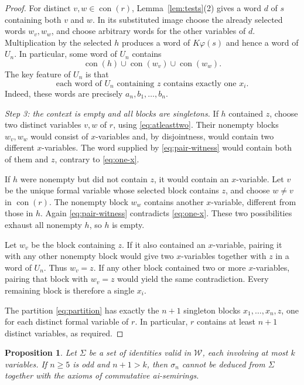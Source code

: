 \documentclass[11pt,reqno]{amsart}
\numberwithin{equation}{section}
\newtheorem{proposition}[theorem]{Proposition}
\theoremstyle{definition}
\theoremstyle{remark}
\DeclareMathOperator{\con}{con}
\newcommand{\W}{\mathcal W}
\begin{document}
\begin{proof}
For distinct $v,w\in\con(r)$,
Lemma~\ref{lem:tests}(2) gives a word $d$ of $s$ containing
both $v$ and $w$. In its substituted image choose the already
selected words $w_v,w_w$, and choose arbitrary words for the
other variables of $d$. Multiplication by the selected $h$
produces a word of $K\varphi(s)$ and hence a word of $U_n$.
In particular, some word of $U_n$ contains
\begin{equation}\label{eq:pair-witness}
\con(h)\cup\con(w_v)\cup\con(w_w).
\end{equation}
The key feature of $U_n$ is that
\begin{equation}\label{eq:one-x}
\text{each word of $U_n$ containing $z$ contains exactly one $x_i$.}
\end{equation}
Indeed, these words are precisely $a_n,b_1,\ldots,b_n$.

\emph{Step 3: the context is empty and all blocks are singletons.}
If $h$ contained $z$, choose two distinct variables $v,w$
of $r$, using \eqref{eq:atleasttwo}. Their nonempty blocks
$w_v,w_w$ would consist of $x$-variables and, by disjointness,
would contain two different $x$-variables. The word supplied
by \eqref{eq:pair-witness} would contain both of them and
$z$, contrary to \eqref{eq:one-x}.

If $h$ were nonempty but did not contain $z$, it would
contain an $x$-variable. Let $v$ be the unique formal
variable whose selected block contains $z$, and choose
$w\neq v$ in $\con(r)$. The nonempty block $w_w$ contains
another $x$-variable, different from those in $h$. Again
\eqref{eq:pair-witness} contradicts \eqref{eq:one-x}.
These two possibilities exhaust all nonempty $h$, so $h$
is empty.

Let $w_v$ be the block containing $z$. If it also contained
an $x$-variable, pairing it with any other nonempty block
would give two $x$-variables together with $z$ in a word
of $U_n$. Thus $w_v=z$. If any other block contained two
or more $x$-variables, pairing that block with $w_v=z$
would yield the same contradiction. Every remaining block
is therefore a single $x_i$.

The partition \eqref{eq:partition} has exactly the $n+1$
singleton blocks $x_1,\ldots,x_n,z$, one for each distinct
formal variable of $r$. In particular, $r$ contains at
least $n+1$ distinct variables, as required.
\end{proof}

\begin{proposition}\label{prop:bounded}
Let $\Sigma$ be a set of identities valid in $\W$, each
involving at most $k$ variables. If $n\geq5$ is odd and
$n+1>k$, then $\sigma_n$ cannot be deduced from $\Sigma$
together with the axioms of commutative ai-semirings.
\end{proposition}
\end{document}

